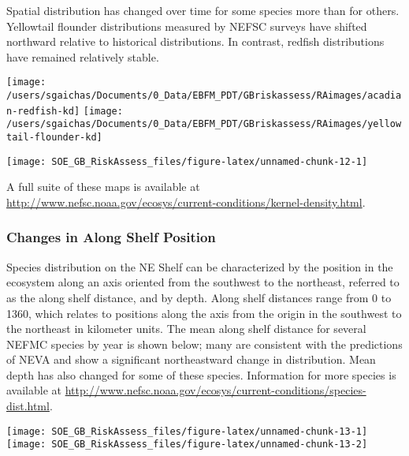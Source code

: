 \documentclass[11pt,]{article}
\let\origfigure\figure
\let\endorigfigure\endfigure
\renewenvironment{figure}[1][2] {
    \expandafter\origfigure\expandafter[H]
} {
    \endorigfigure
}
\begin{document}
Spatial distribution has changed over time for some species more than
for others. Yellowtail flounder distributions measured by NEFSC surveys
have shifted northward relative to historical distributions. In
contrast, redfish distributions have remained relatively stable.

\texttt{[image: /users/sgaichas/Documents/0\_Data/EBFM\_PDT/GBriskassess/RAimages/acadian-redfish-kd]}
\texttt{[image: /users/sgaichas/Documents/0\_Data/EBFM\_PDT/GBriskassess/RAimages/yellowtail-flounder-kd]}

\begin{figure}

{\centering \texttt{[image: SOE\_GB\_RiskAssess\_files/figure-latex/unnamed-chunk-12-1]} 

}

\caption{Shifts in species distribution, 1970s (blue), recent (red) and overlap (purple) \label{dists}}\label{fig:unnamed-chunk-12}
\end{figure}

A full suite of these maps is available at
\url{http://www.nefsc.noaa.gov/ecosys/current-conditions/kernel-density.html}.

\subsubsection{Changes in Along Shelf
Position}\label{changes-in-along-shelf-position}

Species distribution on the NE Shelf can be characterized by the
position in the ecosystem along an axis oriented from the southwest to
the northeast, referred to as the along shelf distance, and by depth.
Along shelf distances range from 0 to 1360, which relates to positions
along the axis from the origin in the southwest to the northeast in
kilometer units. The mean along shelf distance for several NEFMC species
by year is shown below; many are consistent with the predictions of NEVA
and show a significant northeastward change in distribution. Mean depth
has also changed for some of these species. Information for more species
is available at
\url{http://www.nefsc.noaa.gov/ecosys/current-conditions/species-dist.html}.

\begin{figure}

{\centering \texttt{[image: SOE\_GB\_RiskAssess\_files/figure-latex/unnamed-chunk-13-1]} \texttt{[image: SOE\_GB\_RiskAssess\_files/figure-latex/unnamed-chunk-13-2]} 

}

\caption{Shifts in species distribution over time; A: Yellowtail flounder, B: Winter flounder, C: Cod, D: Haddock, E: Atlantic herring, F: Acadian redfish \label{shifts}}\label{fig:unnamed-chunk-13}
\end{figure}
\end{document}
